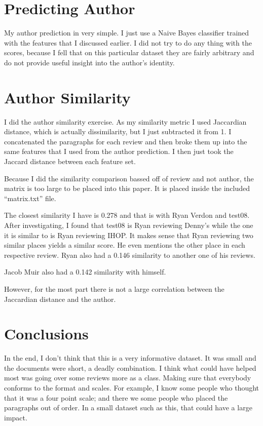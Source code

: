 \documentclass[]{IEEEtran}
\begin{document}
\section{Predicting Author}
My author prediction in very simple. I just use a Naive Bayes classifier trained with the features that I discussed earlier.
I did not try to do any thing with the scores, because I fell that on this particular dataset they are fairly arbitrary and do not provide useful insight into
the author's identity.

\section{Author Similarity}
I did the author similarity exercise. As my similarity metric I used Jaccardian distance, which is actually dissimilarity, but I just subtracted it from 1.
I concatenated the paragraphs for each review and then broke them up into the same features that I used from the author prediction.
I then just took the Jaccard distance between each feature set.

Because I did the similarity comparison bassed off of review and not author, the matrix is too large to be placed into this paper. It is placed inside the included
``matrix.txt'' file.

The closest similarity I have is 0.278 and that is with Ryan Verdon and test08. After investigating, I found that test08 is Ryan reviewing Denny's while the one it
is similar to is Ryan reviewing IHOP. It makes sense that Ryan reviewing two similar places yields a similar score. He even mentions the other place in each respective
review. Ryan also had a 0.146 similarity to another one of his reviews.

Jacob Muir also had a 0.142 similarity with himself.

However, for the most part there is not a large correlation between the Jaccardian distance and the author.

\section{Conclusions}
In the end, I don't think that this is a very informative dataset. It was small and the documents were short, a deadly combination.
I think what could have helped most was going over some reviews more as a class. Making sure that everybody conforms to the format and
scales. For example, I know some people who thought that it was a four point scale; and there we some people who placed the paragraphs out of order.
In a small dataset such as this, that could have a large impact.



\end{document}
